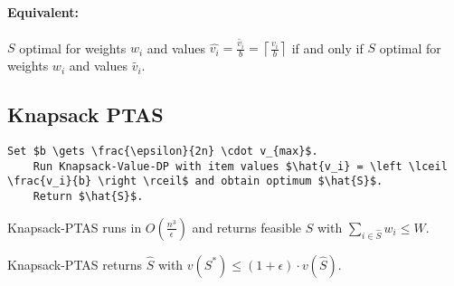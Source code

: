 \paragraph{Equivalent:} $S$ optimal for weights $w_i$ and values $\hat{v_i} = \frac{\tilde{v_i}}{b} = \left \lceil \frac{v_i}{b} \right \rceil$ if and only if $S$ optimal for weights $w_i$ and values $\tilde{v_i}$.

\subsection{Knapsack PTAS}

\begin{lstlisting}[mathescape]
	Set $b \gets \frac{\epsilon}{2n} \cdot v_{max}$.
	Run Knapsack-Value-DP with item values $\hat{v_i} = \left \lceil \frac{v_i}{b} \right \rceil$ and obtain optimum $\hat{S}$.
	Return $\hat{S}$.
\end{lstlisting}

\begin{mytheorem}
Knapsack-PTAS runs in $O(\frac{n^3}{\epsilon})$ and returns feasible $\hat{S}$ with $\sum\limits_{i \in \hat{S}} w_i \le W$.	
\end{mytheorem}

\begin{mytheorem}
Knapsack-PTAS returns $\hat{S}$ with $v(S^*) \le (1+\epsilon) \cdot v(\hat{S})$.	
\end{mytheorem}



